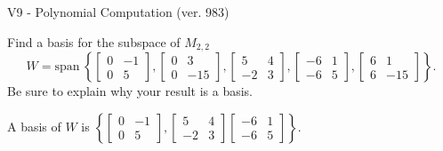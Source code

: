 \begin{exercise}
  \begin{exerciseTitle}V9 - Polynomial Computation (ver. 983)\end{exerciseTitle}
  \begin{exerciseStatement}
    Find a basis for the subspace of \(M_{2,2}\) 
\[W=\mathrm{span}\ \left\{\left[\begin{array}{cc}
0 & -1 \\
0 & 5
\end{array}\right] , \left[\begin{array}{cc}
0 & 3 \\
0 & -15
\end{array}\right] , \left[\begin{array}{cc}
5 & 4 \\
-2 & 3
\end{array}\right] , \left[\begin{array}{cc}
-6 & 1 \\
-6 & 5
\end{array}\right] , \left[\begin{array}{cc}
6 & 1 \\
6 & -15
\end{array}\right]\right\}.\]
 Be sure to explain why your result is a basis.


  \end{exerciseStatement}
  \begin{exerciseAnswer}
   A basis of \(W\) is  \(\left\{\left[\begin{array}{cc}
0 & -1 \\
0 & 5
\end{array}\right] , \left[\begin{array}{cc}
5 & 4 \\
-2 & 3
\end{array}\right] \left[\begin{array}{cc}
-6 & 1 \\
-6 & 5
\end{array}\right]\right\}\).
  


  \end{exerciseAnswer}
\end{exercise}